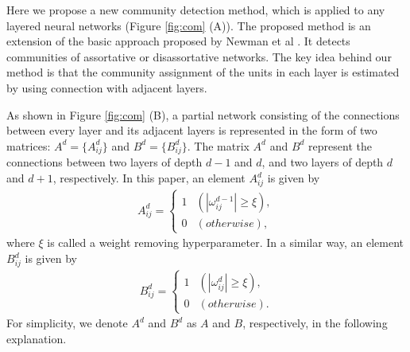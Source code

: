 \documentclass[12pt]{article} %
\begin{document}
Here we propose a new community detection method, which is applied to any layered neural networks (Figure \ref{fig:com} (A)). The proposed method is an extension of the basic approach proposed by Newman et al \cite{Newman2007}. It detects communities of  assortative or disassortative networks. The key idea behind our method is that the community assignment of the units in each layer is estimated by using connection with adjacent layers. 

As shown in Figure \ref{fig:com} (B), a partial network consisting of the connections between every layer and its adjacent layers is represented in the form of two matrices: $A^d=\{A^d_{ij}\}$ and $B^d=\{B^d_{ij}\}$. The matrix $A^d$ and $B^d$ represent the connections between two layers of depth $d-1$ and $d$, and two layers of depth $d$ and $d+1$, respectively. 
In this paper, an element $A^d_{ij}$ is given by
\begin{eqnarray}
  A^d_{ij} = \begin{cases}
    1 & (|\omega^{d-1}_{ij}|\geq \xi), \\
    0 & (otherwise),
  \end{cases}  
  \label{eq:Aelement}
\end{eqnarray}
where $\xi$ is called a weight removing hyperparameter. In a similar way, an element $B^d_{ij}$ is given by
\begin{eqnarray}
  B^d_{ij} = \begin{cases}
    1 & (|\omega^{d}_{ij}|\geq \xi), \\
    0 & (otherwise).
  \end{cases}  
  \label{eq:Belement}
\end{eqnarray}
For simplicity, we denote $A^d$ and $B^d$ as $A$ and $B$, respectively, in the following explanation.
\end{document}
